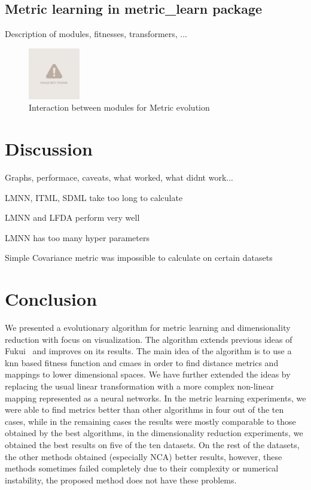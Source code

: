\documentclass[12pt,a4paper]{report}
\begin{document}
\section{Metric learning in metric\_learn package}

Description of modules, fitnesses, transformers, ...

\begin{figure}[h!] \label{fig:implementation-modules}
	\centering
    \includegraphics[width=0.2\textwidth]{img/notfound}
    \caption{Interaction between modules for Metric evolution}
\end{figure}


\chapter{Discussion}

Graphs, performace, caveats, what worked, what didnt work...

LMNN, ITML, SDML take too long to calculate

LMNN and LFDA perform very well

LMNN has too many hyper parameters

Simple Covariance metric was impossible to calculate on certain datasets


\chapter*{Conclusion}

We presented a evolutionary algorithm for metric learning and dimensionality reduction with focus on visualization. The algorithm extends previous ideas of Fukui~\cite{fukui2013evolutionary} and improves on its results. The main idea of the algorithm is to use a \ac{knn} based fitness function and \ac{cmaes} in order to find distance metrics and mappings to lower dimensional spaces. We have further extended the ideas by replacing the usual linear transformation with a more complex non-linear mapping represented as a neural networks. In the metric learning experiments, we were able to find metrics better than other algorithms in four out of the ten cases, while in the remaining cases the results were mostly comparable to those obtained by the best algorithms, in the dimensionality reduction experiments, we obtained the best results on five of the ten datasets. On the rest of the datasets, the other methods obtained (especially NCA) better results, however, these methods sometimes failed completely due to their complexity or numerical instability, the proposed method does not have these problems.
\end{document}
